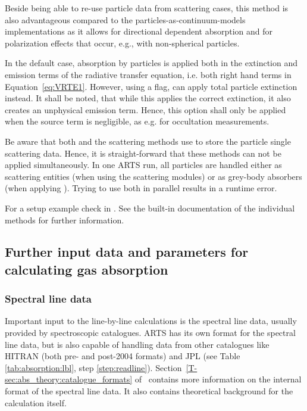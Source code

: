 Beside being able to re-use particle data from scattering cases, this method is
also advantageous compared to the particles-as-continuum-models implementations
as it allows for directional dependent absorption and for polarization effects
that occur, e.g., with non-spherical particles.

In the default case, absorption by particles is applied both in the extinction
and emission terms of the radiative transfer equation, i.e. both right hand
terms in Equation~\ref{eq:VRTE1}. However, using a flag,
 can apply total particle extinction
instead. It shall be noted, that while this applies the correct extinction, it
also creates an unphysical emission term. Hence, this option shall only be
applied when the source term is negligible, as e.g. for occultation
measurements.

Be aware that both  and the scattering methods
use  to store the particle single scattering data.
Hence, it is straight-forward that these methods can not be applied
simultaneously. In one ARTS run, all particles are handled either as scattering
entities (when using the scattering modules) or as grey-body absorbers (when
applying ). Trying to use both in
parallel results in a runtime error.

For a setup example check  in
. See the built-in
documentation of the individual methods for further information.


\subsection{Further input data and parameters for calculating gas absorption}
\label{sec:absorption:input}

\subsubsection{Spectral line data}
\label{sec:absorption:linecat}

Important input to the line-by-line calculations is the spectral line data,
usually provided by spectroscopic catalogues. ARTS has its own format for the
spectral line data, but is also capable of handling data from other catalogues
like HITRAN (both pre- and post-2004 formats) and JPL (see Table
\ref{tab:absorption:lbl}, step \ref{step:readline}).
Section~\ref{T-sec:abs_theory:catalogue_formats} of \theory\ contains more
information on the internal format of the spectral line data.  It also contains
theoretical background for the calculation itself.

